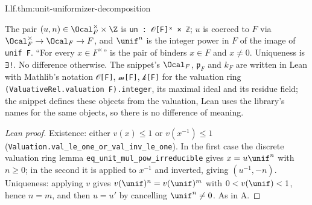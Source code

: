 \begin{theorem}
\end{theorem}
\begin{tfformal}{I.lf.thm:unit-uniformizer-decomposition}
\begin{tffidelity}
The pair $(u,n)\in\Ocal_F^\times\times\Z$ is \texttt{un : 𝒪[F]ˣ × ℤ}; $u$ is coerced to $F$ via $\Ocal_F^\times\to\Ocal_F\to F$, and $\unif^n$ is the integer power in $F$ of the image of \texttt{unif F}. ``For every $x\in F^\times$'' is the pair of binders $x\in F$ and $x\neq0$. Uniqueness is \texttt{∃!}. No difference otherwise. The snippet's $\Ocal_F$, $\mathfrak p_F$ and $k_F$ are written in Lean with Mathlib's notation \texttt{𝒪[F]}, \texttt{𝓂[F]}, \texttt{𝓀[F]} for the valuation ring \texttt{(ValuativeRel.valuation F).integer}, its maximal ideal and its residue field; the snippet defines these objects from the valuation, Lean uses the library's names for the same objects, so there is no difference of meaning.
\end{tffidelity}
\end{tfformal}
\begin{proof}[Lean proof]
Existence: either $v(x)\le1$ or $v(x^{-1})\le1$ (\texttt{Valuation.val\_le\_one\_or\_val\_inv\_le\_one}). In the first case the discrete valuation ring lemma \texttt{eq\_unit\_mul\_pow\_irreducible} gives $x=u\unif^n$ with $n\ge0$; in the second it is applied to $x^{-1}$ and inverted, giving $(u^{-1},-n)$. Uniqueness: applying $v$ gives $v(\unif)^n=v(\unif)^m$ with $0<v(\unif)<1$, hence $n=m$, and then $u=u'$ by cancelling $\unif^n\neq0$. As in A.
\end{proof}

